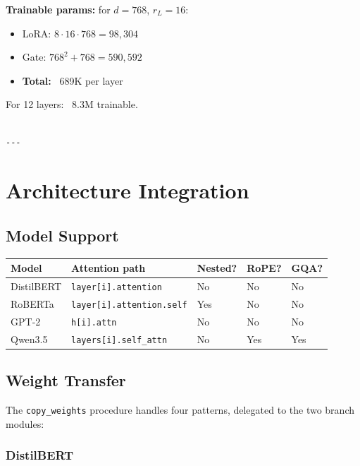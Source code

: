 \textbf{Trainable params:} for $d = 768$, $r_L = 16$:
\begin{itemize}
\item LoRA: $8 \cdot 16 \cdot 768 = 98,304$
\item Gate: $768^2 + 768 = 590,592$
\item \textbf{Total:} ~689K per layer

\end{itemize}
For 12 layers: ~8.3M trainable.
\begin{lstlisting}

---
\end{lstlisting}

\section{Architecture Integration}

\subsection{Model Support}

\begin{table}[H]
\centering
\small
\begin{tabular}{lllll}
\toprule
\textbf{Model} & \textbf{Attention path} & \textbf{Nested?} & \textbf{RoPE?} & \textbf{GQA?} \\
\midrule
DistilBERT & \texttt{layer[i].attention} & No & No & No \\
RoBERTa & \texttt{layer[i].attention.self} & Yes & No & No \\
GPT-2 & \texttt{h[i].attn} & No & No & No \\
Qwen3.5 & \texttt{layers[i].self\_attn} & No & Yes & Yes \\
\bottomrule
\end{tabular}
\end{table}

\subsection{Weight Transfer}

The \texttt{copy\_weights} procedure handles four patterns, delegated to the two 
branch modules:

\subsubsection{DistilBERT}


